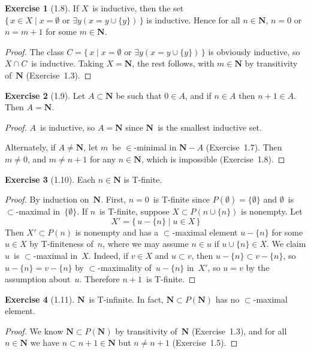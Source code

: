 \documentclass[letterpaper,12pt]{article}
\newcommand{\N}{\boldsymbol{N}}
\renewcommand{\P}{P}
\newcommand{\union}{\cup}
\newcommand{\sect}{\cap}
\newcommand{\suc}[1]{#1\union\{#1\}}
\theoremstyle{definition}
\newtheorem*{exer}{Exercise}
\theoremstyle{remark}
\begin{document}
\begin{exer}[1.8]
If \(X\)~is inductive, then the set \(\{\,x\in X\mid x=\emptyset\text{ or }\exists y(x=\suc{y})\,\}\) is inductive. Hence for all \(n\in\N\), \(n=0\) or \(n=m+1\) for some \(m\in\N\).
\end{exer}
\begin{proof}
The class \(C=\{\,x\mid x=\emptyset\text{ or }\exists y(x=\suc{y})\,\}\) is obviously inductive, so \(X\sect C\)~is inductive. Taking \(X=\N\), the rest follows, with \(m\in\N\) by transitivity of~\(\N\) (Exercise~1.3).
\end{proof}

\begin{exer}[1.9]
Let \(A\subset\N\) be such that \(0\in A\), and if \(n\in A\) then \(n+1\in A\). Then \(A=\N\).
\end{exer}
\begin{proof}
\(A\)~is inductive, so \(A=\N\) since \(\N\)~is the smallest inductive set.

Alternately, if \(A\ne\N\), let \(m\)~be \(\in\)-minimal in \(\N-A\) (Exercise~1.7). Then \(m\ne0\), and \(m\ne n+1\) for any \(n\in\N\), which is impossible (Exercise~1.8).
\end{proof}

\begin{exer}[1.10]
Each \(n\in\N\) is T-finite.
\end{exer}
\begin{proof}
By induction on~\(\N\). First, \(n=0\)~is T-finite since \(\P(\emptyset)=\{\emptyset\}\) and \(\emptyset\)~is \(\subset\)-maximal in~\(\{\emptyset\}\). If \(n\)~is T-finite, suppose \(X\subset\P(\suc{n})\) is nonempty. Let
\[X'=\{\,u-\{n\}\mid u\in X\,\}\]
Then \(X'\subset\P(n)\) is nonempty and has a \(\subset\)-maximal element \(u-\{n\}\) for some \(u\in X\) by T-finiteness of~\(n\), where we may assume \(n\in u\) if \(u\union\{n\}\in X\). We claim \(u\)~is \(\subset\)-maximal in~\(X\). Indeed, if \(v\in X\) and \(u\subset v\), then \(u-\{n\}\subset v-\{n\}\), so \(u-\{n\}=v-\{n\}\) by \(\subset\)-maximality of~\(u-\{n\}\) in~\(X'\), so \(u=v\) by the assumption about~\(u\). Therefore \(n+1\)~is T-finite.
\end{proof}

\begin{exer}[1.11]
\(\N\)~is T-infinite. In fact, \(\N\subset\P(\N)\) has no \(\subset\)-maximal element.
\end{exer}
\begin{proof}
We know \(\N\subset\P(\N)\) by transitivity of~\(\N\) (Exercise~1.3), and for all \(n\in\N\) we have \(n\subset n+1\in\N\) but \(n\ne n+1\) (Exercise~1.5).
\end{proof}
\end{document}
